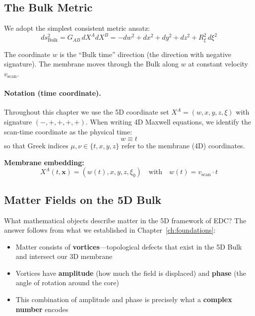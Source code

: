 \subsection{The Bulk Metric}

We adopt the simplest consistent metric ansatz:
\begin{equation}
ds^2_{\text{Bulk}} = G_{AB}\,dX^A dX^B = -dw^2 + dx^2 + dy^2 + dz^2 + R_\xi^2\,d\xi^2
\label{eq:bulk_metric}
\end{equation}

The coordinate $w$ is the ``Bulk time'' direction (the direction with negative signature). The membrane moves through the Bulk along $w$ at constant velocity $v_{\text{scan}}$.

\paragraph{Notation (time coordinate).}
Throughout this chapter we use the 5D coordinate set $X^A = (w, x, y, z, \xi)$ with signature $(-,+,+,+,+)$. When writing 4D Maxwell equations, we identify the scan-time coordinate as the physical time:
\begin{equation}
w \equiv t
\end{equation}
so that Greek indices $\mu, \nu \in \{t, x, y, z\}$ refer to the membrane (4D) coordinates.

\textbf{Membrane embedding:}
\begin{equation}
X^A(t,\mathbf{x}) = (w(t), x, y, z, \xi_0) \quad \text{with} \quad w(t) = v_{\text{scan}} \cdot t
\label{eq:membrane_embedding}
\end{equation}

\subsection{Matter Fields on the 5D Bulk}

What mathematical objects describe matter in the 5D framework of EDC? The answer follows from what we established in Chapter~\ref{ch:foundations}:

\begin{itemize}
    \item Matter consists of \textbf{vortices}---topological defects that exist in the 5D Bulk and intersect our 3D membrane
    \item Vortices have \textbf{amplitude} (how much the field is displaced) and \textbf{phase} (the angle of rotation around the core)
    \item This combination of amplitude and phase is precisely what a \textbf{complex number} encodes
\end{itemize}

